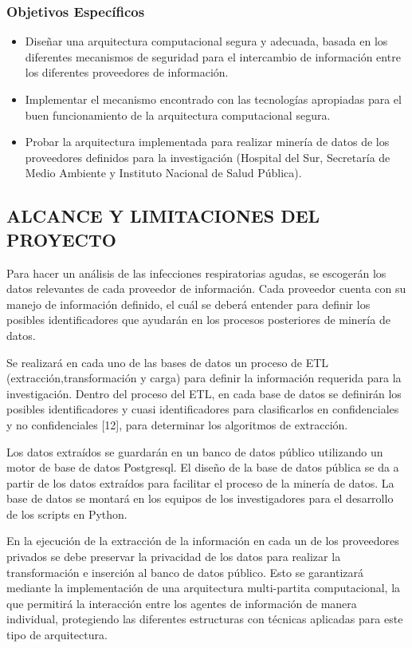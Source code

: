 \documentclass[a4paper, 12pt, oneside]{article}
\theoremstyle{definition}
\theoremstyle{remark}
\begin{document}
\subsubsection{Objetivos Específicos}
\begin{itemize}
\item Diseñar una arquitectura computacional segura y adecuada, basada en los diferentes mecanismos de seguridad para el intercambio de información entre los diferentes proveedores de información.
\item Implementar el mecanismo encontrado con las tecnologías apropiadas para el buen funcionamiento de la arquitectura computacional segura.
\item Probar la arquitectura implementada para realizar minería de datos de los proveedores definidos para la investigación (Hospital del Sur, Secretaría de Medio Ambiente y Instituto Nacional de Salud Pública).

\end{itemize}

\subsection{ALCANCE Y LIMITACIONES DEL PROYECTO}

Para hacer un análisis de las infecciones respiratorias agudas, se escogerán los datos relevantes de cada proveedor de información. Cada proveedor cuenta con su  manejo de información definido, el cuál se deberá entender para definir los posibles identificadores que ayudarán en los procesos posteriores de minería de datos. 

Se realizará en cada uno de las bases de datos un proceso de ETL (extracción,transformación y carga) para definir la información requerida para la investigación. Dentro del proceso del ETL, en cada base de datos se definirán los posibles identificadores y cuasi identificadores para clasificarlos en confidenciales y no confidenciales [12], para determinar los algoritmos de extracción.

Los datos extraídos se guardarán en un banco de datos público utilizando un motor de base de datos Postgresql. El diseño de la base de datos pública se da a partir de los datos extraídos para facilitar el proceso de la minería de datos. La base de datos se montará en los equipos de los  investigadores para el desarrollo de los scripts en Python.

En la ejecución de la extracción de la información en cada un de los proveedores privados se debe preservar la privacidad de los datos para realizar la transformación e inserción al banco de datos público. Esto se garantizará mediante la implementación de una arquitectura multi-partita computacional, la que permitirá la interacción entre los agentes de información de manera individual, protegiendo las diferentes estructuras con técnicas aplicadas para este tipo de arquitectura.
\end{document}
